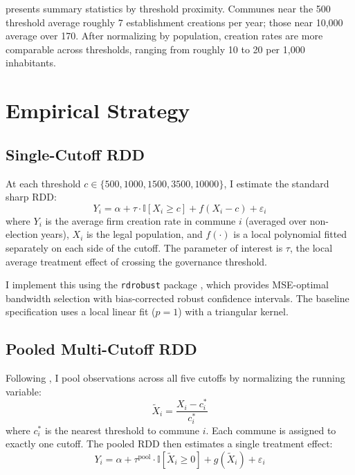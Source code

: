 \documentclass[12pt]{article}
\newcommand{\ind}{\mathbb{I}}
\begin{document}
 presents summary statistics by threshold proximity. Communes near the 500 threshold average roughly 7 establishment creations per year; those near 10,000 average over 170. After normalizing by population, creation rates are more comparable across thresholds, ranging from roughly 10 to 20 per 1,000 inhabitants.



\section{Empirical Strategy}

\subsection{Single-Cutoff RDD}

At each threshold $c \in \{500, 1000, 1500, 3500, 10000\}$, I estimate the standard sharp RDD:
\begin{equation}
Y_i = \alpha + \tau \cdot \ind[X_i \geq c] + f(X_i - c) + \varepsilon_i
\label{eq:rdd}
\end{equation}
where $Y_i$ is the average firm creation rate in commune $i$ (averaged over non-election years), $X_i$ is the legal population, and $f(\cdot)$ is a local polynomial fitted separately on each side of the cutoff. The parameter of interest is $\tau$, the local average treatment effect of crossing the governance threshold.

I implement this using the \texttt{rdrobust} package \citep{calonico2014}, which provides MSE-optimal bandwidth selection with bias-corrected robust confidence intervals. The baseline specification uses a local linear fit ($p = 1$) with a triangular kernel.

\subsection{Pooled Multi-Cutoff RDD}

Following \citet{cattaneo2016}, I pool observations across all five cutoffs by normalizing the running variable:
\begin{equation}
\tilde{X}_i = \frac{X_i - c_i^*}{c_i^*}
\label{eq:normalize}
\end{equation}
where $c_i^*$ is the nearest threshold to commune $i$. Each commune is assigned to exactly one cutoff. The pooled RDD then estimates a single treatment effect:
\begin{equation}
Y_i = \alpha + \tau^{\text{pool}} \cdot \ind[\tilde{X}_i \geq 0] + g(\tilde{X}_i) + \varepsilon_i
\label{eq:pooled}
\end{equation}
\end{document}
